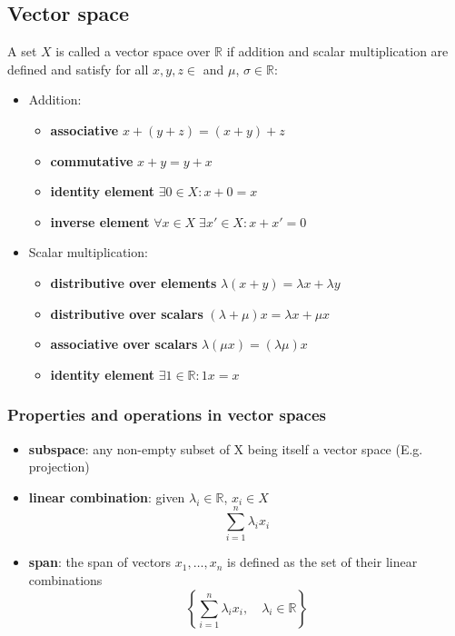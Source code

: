 \documentclass[a4paper, 10pt, titlepage]{article}
\begin{document}
\subsection{Vector space}
A set $X$ is called a vector space over $\mathbb{R}$ if addition and scalar multiplication are defined and satisfy for all $x, y, z \in
$ and $\mu$, $\sigma \in \mathbb{R}$:
\begin{itemize}
\item Addition:	
	\begin{itemize}
	\item \textbf{associative} $x + (y + z) = (x + y) + z$
	\item \textbf{commutative} $x + y = y + x$
	\item \textbf{identity element} $\exists 0 \in X : x + 0 = x$
	\item \textbf{inverse element} $\forall x \in X \; \exists x' \in X : x + x' = 0$
	\end{itemize}
\item Scalar multiplication:
	\begin{itemize}
	\item \textbf{distributive over elements} $\lambda(x + y) = \lambda x + \lambda y$
	\item \textbf{distributive over scalars} $(\lambda + \mu)x = \lambda x + \mu x$
	\item \textbf{associative over scalars} $\lambda (\mu x) = (\lambda\mu)x$
	\item \textbf{identity element} $\exists 1 \in \mathbb{R} : 1x = x$
	\end{itemize}
\end{itemize}
\subsubsection{Properties and operations in vector spaces}
\begin{itemize}
\item \textbf{subspace}: any non-empty subset of X being itself a vector space (E.g. projection)
\item \textbf{linear combination}: given $\lambda_i \in \mathbb{R}$, $x_i \in X$
$$\sum_{i=1}^{n} \lambda_i x_i$$
\item 	\textbf{span}: the span of vectors $x_1, \dots , x_n$ is defined as the set of their linear combinations
$$\left\lbrace \sum_{i=1}^{n} \lambda_i x_i, \quad \lambda_i \in \mathbb{R} \right\rbrace$$
\end{itemize}
\end{document}
